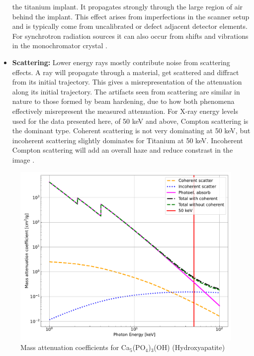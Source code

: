 \begin{itemize}
		the titanium implant. It propagates strongly through the large
		region of air behind the implant. This effect arises from
		imperfections in the scanner setup and is typically come from
		uncalibrated or defect adjacent detector elements. For
		synchrotron radiation sources it can also occur from shifts and
		vibrations in the monochromator crystal \citep{ringartefacts}.
	\item \textbf{Scattering:} Lower energy rays mostly contribute noise
		from scattering effects. A ray will propagate through a
		material, get scattered and diffract from its initial
		trajectory. This gives a misrepresentation of the attenuation
		along its initial trajectory. The artifacts seen from
		scattering are similar in nature to those formed by beam
		hardening, due to how both phenomena effectively misrepresent
		the measured attenuation.  For X-ray energy levels used for the
		data presented here, of 50 keV and above, Compton scattering is
		the dominant type.  Coherent scattering is not very dominating
		at 50 keV, but incoherent scattering slightly dominates for
		Titanium at 50 keV. Incoherent Compton scattering will add an
		overall haze and reduce constrast in the image
		\citep{Compton}\citep{xray-attenuation-10-kev-100-mev}\citep{attenuation-cross-sections}.
\end{itemize}

\begin{figure}
    \centering
    \includegraphics[width=\linewidth]{figures/attenuation_hydroxyapatite.pdf}
    \caption{
	    Mass attenuation coefficients for Ca$_{5}$(PO$_{4}$)$_{3}$(OH) (Hydroxyapatite)
    }
    \label{fig:attenuation}
\end{figure}

